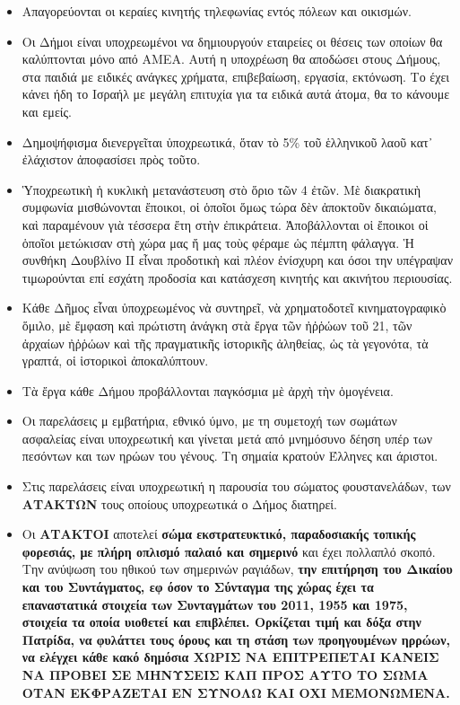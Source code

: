 \documentclass[a4paper]{article}
\begin{document}
\begin{itemize}
\item Απαγορεύονται οι κεραίες κινητής τηλεφωνίας εντός πόλεων και οικισμών.
\item Οι Δήμοι είναι υποχρεωμένοι να δημιουργούν εταιρείες οι θέσεις των οποίων θα καλύπτονται μόνο από ΑΜΕΑ. Αυτή η υποχρέωση θα αποδώσει στους Δήμους, στα παιδιά με ειδικές ανάγκες χρήματα, επιβεβαίωση, εργασία, εκτόνωση. Το έχει κάνει ήδη το Ισραήλ με μεγάλη επιτυχία για τα ειδικά αυτά άτομα, θα το κάνουμε και εμείς.
\item Δημοψήφισμα διενεργεῖται ὑποχρεωτικά, ὅταν τὸ 5\% τοῦ ἑλληνικοῦ λαοῦ κατ᾿ ἐλάχιστον ἀποφασίσει πρὸς τοῦτο.
\item Ὑποχρεωτικὴ ἡ κυκλικὴ μετανάστευση στὸ ὅριο τῶν 4 ἐτῶν. Μὲ διακρατικὴ συμφωνία μισθώνονται ἔποικοι, οἱ ὁποῖοι ὅμως τώρα δὲν ἀποκτοῦν δικαιώματα, καὶ παραμένουν γιὰ τέσσερα ἔτη στὴν ἐπικράτεια. Ἀποβάλλονται οἱ ἔποικοι οἱ ὁποῖοι μετώκισαν στὴ χώρα μας ἤ μας τοὺς φέραμε ὡς πέμπτη φάλαγγα. Ἡ συνθήκη Δουβλίνο ΙΙ εἶναι προδοτικὴ καὶ πλέον ἐνίσχυρη και όσοι την υπέγραψαν τιμωρούνται επί εσχάτη προδοσία και κατάσχεση κινητής και ακινήτου περιουσίας.
\item Κάθε Δῆμος εἶναι ὑποχρεωμένος νὰ συντηρεῖ, νὰ χρηματοδοτεῖ κινηματογραφικὸ ὅμιλο, μὲ ἔμφαση καὶ πρώτιστη ἀνάγκη στὰ ἔργα τῶν ἠῤῥώων τοῦ 21, τῶν ἀρχαίων ἠῤῥώων καὶ τῆς πραγματικῆς ἱστορικῆς ἀληθείας, ὡς τὰ γεγονότα, τὰ γραπτά, οἱ ἱστορικοὶ ἀποκαλύπτουν.
\item Τὰ ἔργα κάθε Δήμου προβάλλονται παγκόσμια μὲ ἀρχὴ τὴν ὁμογένεια.
\item Οι παρελάσεις μ εμβατήρια, εθνικό ύμνο, με τη συμετοχή των σωμάτων ασφαλείας είναι υποχρεωτική και γίνεται μετά από μνημόσυνο δέηση υπέρ των πεσόντων και των ηρώων του γένους. Τη σημαία κρατούν Έλληνες και άριστοι.
\item Στις παρελάσεις είναι υποχρεωτική η παρουσία του σώματος φουστανελάδων, των \textbf{ΑΤΑΚΤΩΝ} τους οποίους υποχρεωτικά ο Δήμος διατηρεί.
\item Οι \textbf{ΑΤΑΚΤΟΙ} αποτελεί \textbf{σώμα εκστρατευκτικό, παραδοσιακής τοπικής φορεσιάς, με πλήρη οπλισμό παλαιό και σημερινό }και έχει πολλαπλό σκοπό. Την ανύψωση του ηθικού των σημερινών ραγιάδων, \textbf{την επιτήρηση του Δικαίου και του Συντάγματος, εφ όσον το Σύνταγμα της χώρας έχει τα επαναστατικά στοιχεία των Συνταγμάτων του 2011, 1955 και 1975, στοιχεία τα οποία υιοθετεί και επιβλέπει. Ορκίζεται τιμή και δόξα στην Πατρίδα, να φυλάττει τους όρους και τη στάση των προηγουμένων ηρρώων, να ελέγχει κάθε κακό δημόσια ΧΩΡΙΣ ΝΑ ΕΠΙΤΡΕΠΕΤΑΙ ΚΑΝΕΙΣ ΝΑ ΠΡΟΒΕΙ ΣΕ ΜΗΝΥΣΕΙΣ ΚΛΠ ΠΡΟΣ ΑΥΤΟ ΤΟ ΣΩΜΑ ΟΤΑΝ ΕΚΦΡΑΖΕΤΑΙ ΕΝ ΣΥΝΟΛΩ ΚΑΙ ΟΧΙ ΜΕΜΟΝΩΜΕΝΑ.}

\end{itemize}
\end{document}

